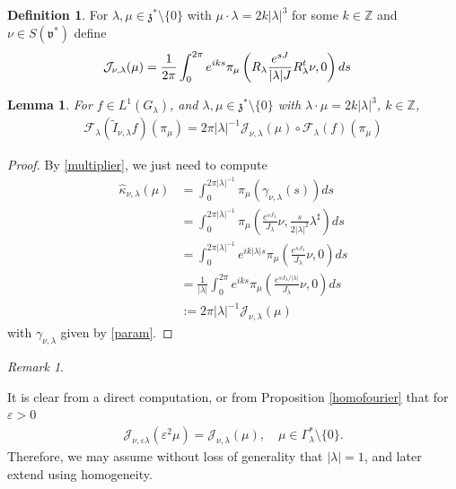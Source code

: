 \documentclass[11pt]{amsart}
\theoremstyle{plain}
\newtheorem{lemma}[theorem]{Lemma}
\theoremstyle{definition}
\newtheorem{definition}[theorem]{Definition}
\theoremstyle{remark}
\newtheorem{remark}[theorem]{Remark}
\numberwithin{equation}{section}
\def\fz{\mathfrak{z}}
\def\fv{\mathfrak{v}}
\def\cJ{\mathcal{J}}
\def\mz{\setminus\{0\}}
\def\eps{\varepsilon}
\numberwithin{equation}{section}
\begin{document}
\begin{definition}\label{d:J}
	For $\lambda, \mu\in \fz^*\setminus\{0\}$  with $\mu\cdot\lambda =2k|\lambda|^3$ for some $k\in \mathbb{Z}$ and $\nu\in S(\fv^*)$ define
	\begin{align*}
		\cJ_{\nu, \lambda}(\mu)
		&=\frac{1}{2\pi}\int_0^{2\pi }e^{iks}\pi_\mu\left(R_\lambda\frac{ e^{sJ}}{|\lambda|J}R_\lambda^{{\rm{t}}}\nu, 0\right)ds
	\end{align*}
\end{definition}

\begin{lemma}\label{FourierSliceLemma} For $f\in L^1(G_\lambda)$, and $\lambda, \mu\in \mathfrak{z}^*\setminus\{0\}$ with $\lambda\cdot\mu=2k|\lambda|^3$, $k\in \mathbb{Z}$,
	\begin{align*}
	\mathcal{F}_\lambda\left(\widetilde{I}_{\nu, \lambda} f\right)(\pi_\mu)=2\pi|\lambda|^{-1}\mathcal{J}_{\nu, \lambda}( \mu)\circ\mathcal{F}_\lambda(f)(\pi_\mu)
	\end{align*}	
\end{lemma}
\begin{proof}
	
	By \eqref{multiplier}, we just need to compute
	\begin{align*}
	\hat{\kappa}_{\nu, \lambda}(\mu)
	&=\int_0^{2\pi|\lambda|^{-1}}\pi_\mu(\gamma_{\nu, \lambda}(s))ds\\
	&=\int_0^{2\pi |\lambda|^{-1}}\pi_\mu\left(\frac{e^{sJ_\lambda}}{J_\lambda}\nu, \frac{s}{2|\lambda|^2}\lambda^\sharp\right)ds\\
	&=\int_0^{2\pi |\lambda|^{-1}}e^{ik|\lambda|s}\pi_\mu\left(\frac{e^{sJ_\lambda}}{J_\lambda}\nu, 0\right)ds\\
	&=\frac{1}{|\lambda|}\int_0^{2\pi }e^{iks}\pi_\mu\left(\frac{e^{sJ_\lambda/|\lambda|}}{J_\lambda}\nu, 0\right)ds\\
	&:=2\pi|\lambda|^{-1}\mathcal{J}_{\nu, \lambda}(\mu)
	\end{align*}
with $\gamma_{\nu, \lambda}$ given by \eqref{param}. 
\end{proof}

\begin{remark}\label{r:scaleJ}

	It is clear from a direct computation, or from Proposition \ref{homofourier} that for $\eps>0$
	\begin{align*}
		\cJ_{\nu, \eps\lambda}(\eps^2\mu)=\cJ_{\nu, \lambda}(\mu), \quad \mu\in \Gamma_\lambda^*\mz.
	\end{align*}
	Therefore, we may assume without loss of generality that $|\lambda|=1$, and later extend using homogeneity. 
\end{remark}
\end{document}

